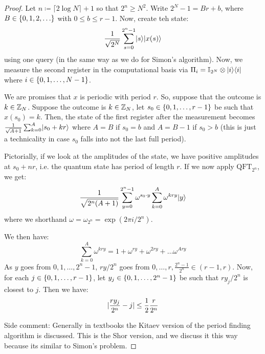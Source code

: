 \begin{proof}
    Let $n \coloneqq \lceil 2\log N \rceil + 1$ so that $2^n \geq N^2$. Write $2^N -1 = Br + b$, where $B \in \set{0, 1, 2, \ldots}$ with $0 \leq b \leq r - 1$. Now, create teh state:
    \begin{equation}
        \frac{1}{\sqrt{2^N}}\sum_{s=0}^{2^n-1}\lvert s \rangle\lvert x(s) \rangle
    \end{equation}
    using one query (in the same way as we do for Simon's algorithm). Now, we measure the second register in the computational basis via $\Pi_i = \mathbb{I}_{2^N} \otimes \lvert i \rangle \langle i \rvert$ where $i \in \set{0,1, \ldots, N-1}$. 

    We are promises that $x$ is periodic with period $r$. So, suppose that the outcome is $k \in \mathbb{Z}_N$. Suppose the outcome is $k \in \mathbb{Z}_N$, let $s_0 \in \set{0, 1, \ldots, r-1}$ be such that $x(s_0) = k$. Then, the state of the first register after the measurement becomes $\frac{1}{\sqrt{A + 1}}\sum_{k=0}^A \lvert s_0 + kr \rangle$ where $A = B$ if $s_0 = b$ and $A = B - 1$ if $s_0 > b$ (this is just a technicality in case $s_0$ falls into not the last full period).

    Pictorially, if we look at the amplitudes of the state, we have positive amplitudes at $s_0 + nr$, i.e. the quantum state has period of length $r$. If we now apply $\text{QFT}_{2^n}$, we get:
    \begin{equation}
        \frac{1}{\sqrt{2^n(A+1)}}\sum_{y=0}^{2^n-1}\omega^{s_0 \cdot y}\sum_{k=0}^A \omega^{kry}\lvert y \rangle
    \end{equation}
    where we shorthand $\omega = \omega_{2^n} = \exp(2\pi i/2^n)$. 

    We then have:
    \begin{equation}
        \sum_{k=0}^A \omega^{kry} = 1 + \omega^{ry} + \omega^{2ry} + \ldots \omega^{Ary}
    \end{equation}
    As $y$ goes from $0, 1, \ldots, 2^{n}-1$, $ry/2^n$ goes from $0, \ldots, r, \frac{2^n-1}{2^n} \in (r-1, r)$. Now, for each $j \in \set{0, 1, \ldots, r-1}$, let $y_j \in \set{0, 1, \ldots, 2^n-1}$ be such that $ry_j/2^n$ is closest to $j$. Then we have:
    \begin{equation}
        \lvert \frac{ry_j}{2^n} - j \rvert \leq \frac{1}{2}\frac{r}{2^n}
    \end{equation}

    Side comment: Generally in textbooks the Kitaev version of the period finding algorithm is discussed. This is the Shor version, and we discuss it this way because its similar to Simon's problem.


\end{proof}

